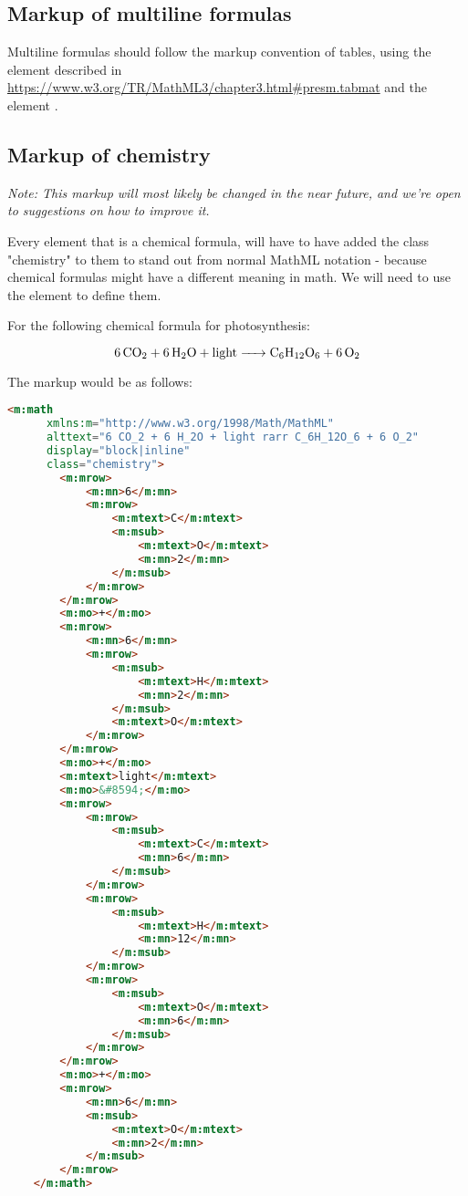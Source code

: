 \documentclass[english,a4paper,11pt]{article}
\begin{document}
\subsection{Markup of multiline formulas}

Multiline formulas should follow the markup convention of tables, using the  element described in \url{https://www.w3.org/TR/MathML3/chapter3.html#presm.tabmat} and the element .

\subsection{Markup of chemistry}\label{chemistry}

\textit{Note: This markup will most likely be changed in the near future, and we're open to suggestions on how to improve it.}

Every  element that is a chemical formula, will have to have added the class "chemistry" to them to stand out from normal MathML notation - because chemical formulas might have a different meaning in math. We will need to use the  element to define them. 

For the following chemical formula for photosynthesis:

\begin{examples}
\begin{equation}
    \ce{6 CO_2 + 6 H_2O + light -> C_6H_12O_6 + 6 O_2}
\end{equation}

The markup would be as follows:
\begin{lstlisting}[language=HTML]
	<m:math 
	  xmlns:m="http://www.w3.org/1998/Math/MathML"
	  alttext="6 CO_2 + 6 H_2O + light rarr C_6H_12O_6 + 6 O_2"
	  display="block|inline"
	  class="chemistry">
		<m:mrow>
			<m:mn>6</m:mn>
			<m:mrow>
				<m:mtext>C</m:mtext>
				<m:msub>
					<m:mtext>O</m:mtext>
					<m:mn>2</m:mn>
				</m:msub>
			</m:mrow>
		</m:mrow>
		<m:mo>+</m:mo>
		<m:mrow>
			<m:mn>6</m:mn>
			<m:mrow>
				<m:msub>
					<m:mtext>H</m:mtext>
					<m:mn>2</m:mn>
				</m:msub>
				<m:mtext>O</m:mtext>
			</m:mrow>
		</m:mrow>
		<m:mo>+</m:mo>
		<m:mtext>light</m:mtext>
		<m:mo>&#8594;</m:mo>
		<m:mrow>
			<m:mrow>
				<m:msub>
					<m:mtext>C</m:mtext>
					<m:mn>6</m:mn>
				</m:msub>
			</m:mrow>
			<m:mrow>
				<m:msub>
					<m:mtext>H</m:mtext>
					<m:mn>12</m:mn>
				</m:msub>
			</m:mrow>
			<m:mrow>
				<m:msub>
					<m:mtext>O</m:mtext>
					<m:mn>6</m:mn>
				</m:msub>
			</m:mrow>
		</m:mrow>
		<m:mo>+</m:mo>
		<m:mrow>
			<m:mn>6</m:mn>
			<m:msub>
				<m:mtext>O</m:mtext>
				<m:mn>2</m:mn>
			</m:msub>
		</m:mrow>
	</m:math>
\end{lstlisting}
\end{examples}
\end{document}
